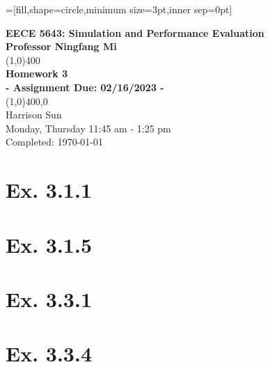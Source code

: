 \documentclass[11]{article}
\begin{document}
=[fill,shape=circle,minimum size=3pt,inner sep=0pt]

\begin{titlepage}
\begin{center}
\vspace*{2cm}
\Large{\textbf{EECE 5643: Simulation and Performance Evaluation}}\\
\Large{\textbf{Professor Ningfang Mi}}\\
\vfill
\line(1,0){400}\\[1mm]
\huge{\textbf{Homework 3}}\\[3mm]
\Large{\textbf{- Assignment Due: 02/16/2023 -}}\\[1mm]
\line(1,0){400,0}\\
\vfill
Harrison Sun\\
Monday, Thursday 11:45 am - 1:25 pm \\
Completed: \today\
\end{center}
\end{titlepage}

\section{\textbf{Ex. 3.1.1}}

\pagebreak

\section{\textbf{Ex. 3.1.5}}

\pagebreak

\section{\textbf{Ex. 3.3.1}}

\pagebreak

\section{\textbf{Ex. 3.3.4}}

\end{document}
